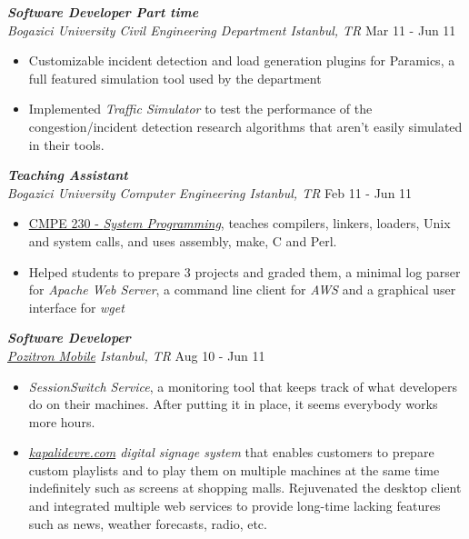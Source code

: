 \documentclass[line, margin]{res}
\begin{document}
\begin{resume}
{\sl \textbf{Software Developer Part time} \\ Bogazici University Civil Engineering Department Istanbul, TR} \hfill Mar 11 - Jun 11 \\
\vspace{-0.3cm}
\begin{itemize} \itemsep -2pt
  \item Customizable incident detection and load generation plugins for Paramics, a full featured simulation tool used by the department
  \item Implemented \textit{Traffic Simulator} to test the performance of the congestion/incident detection research algorithms that aren't easily simulated in their tools.
\end{itemize}

{\sl \textbf{Teaching Assistant} \\ Bogazici University Computer Engineering Istanbul, TR} \hfill Feb 11 - Jun 11 \\
\vspace{-.3cm}
\begin{itemize} \itemsep -2pt
  \item \href{http://www.cmpe.boun.edu.tr/courses/?cmpe=230}{CMPE 230 - \textit{System Programming}}, teaches compilers, linkers, loaders, Unix and system calls, and uses assembly, make, C and Perl.
  \item Helped students to prepare 3 projects and graded them, a minimal log parser for \textit{Apache Web Server}, a command line client for \textit{AWS} and a graphical user interface for \textit{wget}
\end{itemize}

{\sl \textbf{Software Developer} \\ \href{http://www.pozitron.com/}{Pozitron Mobile} Istanbul, TR} \hfill Aug 10 - Jun 11 \\
\vspace{-0.3cm}
\begin{itemize} \itemsep -2pt
  \item \textit{SessionSwitch Service}, a monitoring tool that keeps track of what developers do on their machines. After putting it in place, it seems everybody works more hours.
  \item \textit{\href{http://kapalidevre.com}{kapalidevre.com} digital signage system} that enables customers to prepare custom playlists and to play them on multiple machines at the same time indefinitely such as screens at shopping malls. Rejuvenated the desktop client and integrated multiple web services to provide long-time lacking features such as news, weather forecasts, radio, etc.
\end{itemize}


\end{resume}
\end{document}
